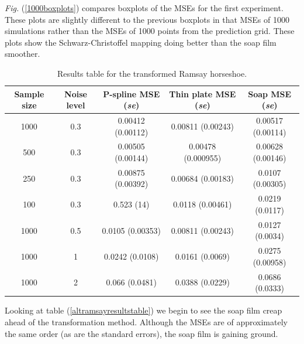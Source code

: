 \documentclass[a4paper,10pt]{amsart}
\newcommand{\sch}{Schwarz-Christoffel }
\newcommand{\Fig}[1]{\emph{Fig.} (\ref{#1})}
\begin{document}
\Fig{1000boxplots} compares boxplots of the MSEs for the first experiment. These plots are slightly different to the previous boxplots in that MSEs of 1000 simulations rather than the MSEs of 1000 points from the prediction grid. These plots show the \sch mapping doing better than the soap film smoother.

\begin{table}[ht]
\begin{tabular}{c c c c c}\\
Sample size & Noise level & P-spline MSE (\emph{se}) & Thin plate MSE (\emph{se}) & Soap MSE (\emph{se}) \\
\hline
\hline
1000 & 0.3 & 0.00412 (0.00112) & 0.00811 (0.00243) & 0.00517 (0.00114) \\ 
500 & 0.3 & 0.00505 (0.00144) & 0.00478 (0.000955) & 0.00628 (0.00146) \\ 
250 & 0.3 & 0.00875 (0.00392) & 0.00684 (0.00183) & 0.0107 (0.00305) \\ 
100 & 0.3 & 0.523 (14) & 0.0118 (0.00461) & 0.0219 (0.0117) \\ 
1000 & 0.5 & 0.0105 (0.00353) & 0.00811 (0.00243) & 0.0127 (0.0034) \\ 
1000 & 1 & 0.0242 (0.0108) & 0.0161 (0.0069) & 0.0275 (0.00958) \\ 
1000 & 2 & 0.066 (0.0481) & 0.0388 (0.0229) & 0.0686 (0.0333) \\ 
\end{tabular}
\label{ramsayresultstable}
\caption{Results table for the transformed Ramsay horseshoe.}
\end{table}

Looking at table (\ref{altramsayresultstable}) we begin to see the soap film creap ahead of the transformation method. Although the MSEs are of approximately the same order (as are the standard errors), the soap film is gaining ground.
\end{document}

